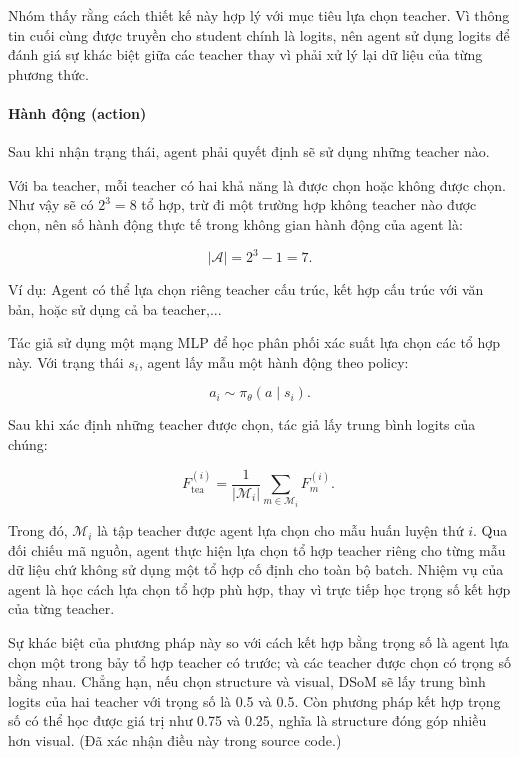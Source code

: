 Nhóm thấy rằng cách thiết kế này hợp lý với mục tiêu
lựa chọn teacher. Vì thông tin cuối cùng được truyền
cho student chính là logits, nên agent sử dụng
logits để đánh giá sự khác biệt giữa các teacher
thay vì phải xử lý lại dữ liệu của từng phương thức.

\paragraph{Hành động (action)}

Sau khi nhận trạng thái, agent phải quyết định sẽ
sử dụng những teacher nào.

Với ba teacher, mỗi teacher có hai khả năng là được
chọn hoặc không được chọn. Như vậy sẽ có $2^3=8$
tổ hợp, trừ đi một trường hợp không teacher nào được chọn, nên số hành động thực tế trong không gian
hành động của agent là:


\begin{equation}
|\mathcal{A}|=2^3-1=7.
\end{equation}

Ví dụ: Agent có thể lựa chọn riêng teacher
cấu trúc, kết hợp cấu trúc với văn bản, hoặc sử
dụng cả ba teacher,...

Tác giả sử dụng một mạng MLP để học phân phối xác
suất lựa chọn các tổ hợp này. Với trạng thái $s_i$,
agent lấy mẫu một hành động theo policy:

\begin{equation}
a_i\sim\pi_\theta(a\mid s_i).
\end{equation}




Sau khi xác định những teacher được chọn, tác giả lấy trung bình logits của chúng:

\begin{equation}
F_{\mathrm{tea}}^{(i)}
=
\frac{1}{|\mathcal{M}_i|}
\sum_{m\in\mathcal{M}_i}F_m^{(i)}.
\ 
\end{equation}

Trong đó, \(\mathcal{M}_i\) là tập teacher được agent lựa chọn cho mẫu huấn luyện thứ \(i\). Qua đối chiếu mã nguồn, agent thực hiện lựa chọn tổ hợp teacher riêng cho từng mẫu dữ liệu chứ không sử dụng một tổ hợp cố định cho toàn bộ batch. Nhiệm vụ của agent là học cách lựa chọn tổ hợp phù hợp, thay vì trực tiếp học trọng số kết hợp của từng teacher.

Sự khác biệt của phương pháp này so với cách kết hợp bằng trọng số là agent lựa chọn một trong bảy tổ hợp teacher có trước; và các teacher được chọn có trọng số bằng nhau. Chẳng hạn, nếu chọn structure và visual, DSoM sẽ lấy trung bình logits của hai teacher với trọng số là 0.5 và 0.5. Còn phương pháp kết hợp trọng số có thể học được giá trị như 0.75 và 0.25, nghĩa là structure đóng góp nhiều hơn visual. (Đã xác nhận điều này trong source code.)

